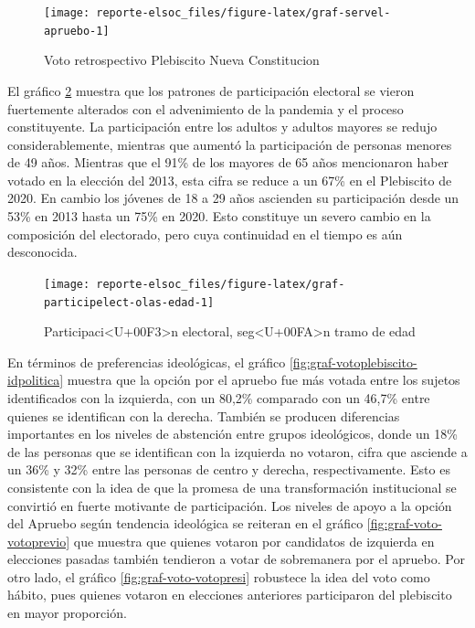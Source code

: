 \documentclass[
  12pt,
]{book}
\begin{document}
\begin{figure}

{\centering \texttt{[image: reporte-elsoc\_files/figure-latex/graf-servel-apruebo-1]} 

}

\caption{Voto retrospectivo Plebiscito Nueva Constitucion}\label{fig:graf-servel-apruebo}
\end{figure}

El gráfico \ref{fig:graf-participelect-olas-edad} muestra que los patrones de participación electoral se vieron fuertemente alterados con el advenimiento de la pandemia y el proceso constituyente. La participación entre los adultos y adultos mayores se redujo considerablemente, mientras que aumentó la participación de personas menores de 49 años. Mientras que el 91\% de los mayores de 65 años mencionaron haber votado en la elección del 2013, esta cifra se reduce a un 67\% en el Plebiscito de 2020. En cambio los jóvenes de 18 a 29 años ascienden su participación desde un 53\% en 2013 hasta un 75\% en 2020. Esto constituye un severo cambio en la composición del electorado, pero cuya continuidad en el tiempo es aún desconocida.

\begin{figure}

{\centering \texttt{[image: reporte-elsoc\_files/figure-latex/graf-participelect-olas-edad-1]} 

}

\caption{Participaci<U+00F3>n electoral, seg<U+00FA>n tramo de edad}\label{fig:graf-participelect-olas-edad}
\end{figure}

En términos de preferencias ideológicas, el gráfico \ref{fig:graf-votoplebiscito-idpolitica} muestra que la opción por el apruebo fue más votada entre los sujetos identificados con la izquierda, con un 80,2\% comparado con un 46,7\% entre quienes se identifican con la derecha. También se producen diferencias importantes en los niveles de abstención entre grupos ideológicos, donde un 18\% de las personas que se identifican con la izquierda no votaron, cifra que asciende a un 36\% y 32\% entre las personas de centro y derecha, respectivamente. Esto es consistente con la idea de que la promesa de una transformación institucional se convirtió en fuerte motivante de participación. Los niveles de apoyo a la opción del Apruebo según tendencia ideológica se reiteran en el gráfico \ref{fig:graf-voto-votoprevio} que muestra que quienes votaron por candidatos de izquierda en elecciones pasadas también tendieron a votar de sobremanera por el apruebo. Por otro lado, el gráfico \ref{fig:graf-voto-votopresi} robustece la idea del voto como hábito, pues quienes votaron en elecciones anteriores participaron del plebiscito en mayor proporción.
\end{document}
